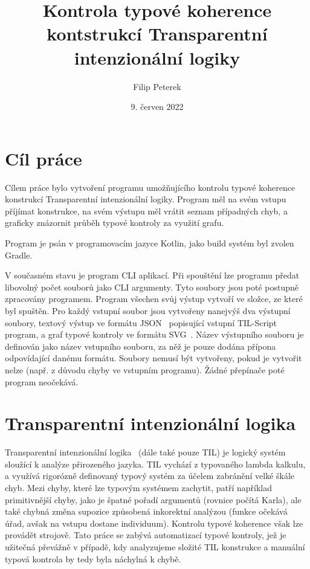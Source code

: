 \documentclass{article}
\title{Kontrola typové koherence kontstrukcí Transparentní intenzionální logiky}
\author{Filip Peterek}
\date{9. červen 2022}
\begin{document}
\maketitle

\section{Cíl práce}

Cílem práce bylo vytvoření programu umožňujícího kontrolu typové koherence konstrukcí Transparentní
intenzionální logiky. Program měl na svém vstupu příjímat konstrukce, na svém výstupu měl
vrátit seznam případných chyb, a graficky znázornit průběh typové kontroly za využití grafu.

Program je psán v programovacím jazyce Kotlin, jako build systém byl zvolen Gradle.

V současném stavu je program CLI aplikací. Při spouštění lze programu předat libovolný počet souborů
jako CLI argumenty. Tyto soubory jsou poté postupně zpracovány programem. Program všechen svůj
výstup vytvoří ve složce, ze které byl spuštěn. Pro každý vstupní soubor jsou vytvořeny nanejvýš
dva výstupní soubory, textový výstup ve formátu JSON~\cite{json-src} popisující vstupní TIL-Script program, a graf
typové kontroly ve formátu SVG~\cite{svg-src}. Název výstupního souboru je definován jako název
vstupního souboru, za něž je pouze dodána přípona odpovídající danému formátu. Soubory nemusí být
vytvořeny, pokud je vytvořit nelze (např. z důvodu chyby ve vstupním programu). Žádné přepínače
poté program neočekává.

\section{Transparentní intenzionální logika}

Transparentní intenzionální logika~\cite{til-duzi} (dále také pouze TIL) je logický systém sloužící
k analýze přirozeného jazyka. TIL vychází z typovaného lambda kalkulu, a využívá rigorózně definovaný
typový systém za účelem zabránění velké škále chyb. Mezi chyby, které lze typovým systémem zachytit,
patří například primitivnější chyby, jako je špatné pořadí argumentů (rovnice počítá Karla), ale také
chybná změna supozice způsobená inkorektní analýzou (funkce očekává úřad, avšak na vstupu dostane
individuum). Kontrolu typové koherence však lze provádět strojově. Tato práce se zabývá automatizací
typové kontroly, jež je užitečná převážně v případě, kdy analyzujeme složité TIL konstrukce a manuální
typová kontrola by tedy byla náchylná k chybě.
\end{document}
